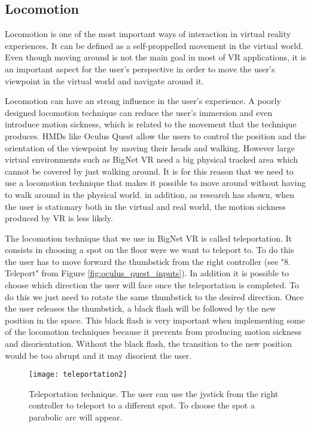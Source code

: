 \subsection{Locomotion}
Locomotion is one of the most important ways of interaction in virtual reality experiences. It can be defined as a self-proppelled movement in the virtual world. Even though moving around is not the main goal in most of VR applications, it is an important aspect for the user's perspective in order to move the user's viewpoint in the virtual world and navigate around it.

Locomotion can have an strong influence in the user's experience. A poorly designed locomotion technique can reduce the user's immersion and even introduce motion sickness, which is related to the movement that the technique produces. HMDs like Oculus Quest allow the users to control the position and the orientation of the viewpoint by moving their heads and walking. However large virtual environments such as BigNet VR need a big physical tracked area which cannot be covered by just walking around. It is for this reason that we need to use a locomotion technique that makes it possible to move around without having to walk around in the physical world\cite{locomotion_technique}. in addition, as research has shown, when the user is stationary both in the virtual and real world, the motion sickness produced by VR is less likely\cite{effect_vr_sickness}.

The locomotion technique that we use in BigNet VR is called teleportation. It consists in choosing a spot on the floor were we want to teleport to. To do this the user has to move forward the thumbstick from the right controller (see "8. Teleport" from Figure \ref{fig:oculus_quest_inputs}). In addition it is possible to choose which direction the user will face once the teleportation is completed. To do this we just need to rotate the same thumbstick to the desired direction. Once the user releases the thumbstick, a black flash will be followed by the new position in the space. This black flash is very important when implementing some of the locomotion techniques because it prevents from producing motion sickness and disorientation. Without the black flash, the transition to the new position would be too abrupt and it may disorient the user.

\begin{figure}[h!]
    \centering%
    \texttt{[image: teleportation2]}
    \caption{Teleportation technique. The user can use the jystick from the right controller to teleport to a different spot. To choose the spot a parabolic arc will appear.}
    \label{fig:teleportation}
\end{figure}%


